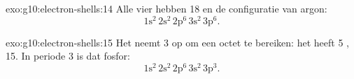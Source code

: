 \begin{solution}{exo:g10:electron-shells:14}
Alle vier hebben 18  en de configuratie van argon:
\[ 1\mathrm{s}^2\,2\mathrm{s}^2\,2\mathrm{p}^6\,3\mathrm{s}^2\,3\mathrm{p}^6. \]
\end{solution}

\begin{solution}{exo:g10:electron-shells:15}
Het neemt 3  op om een octet te bereiken: het heeft 5
,  15. In periode 3 is dat fosfor:
\[ 1\mathrm{s}^2\,2\mathrm{s}^2\,2\mathrm{p}^6\,3\mathrm{s}^2\,3\mathrm{p}^3. \]
\end{solution}

